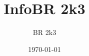 \documentclass[a4paper,11pt]{article}
\title{InfoBR 2k3}
\author{BR 2k3}
\date{\today}
\begin{document}
\maketitle



\pagebreak
\tableofcontents

\pagebreak






\pagebreak

\end{document}
